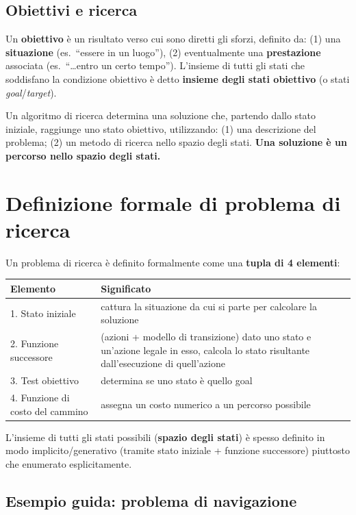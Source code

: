 \documentclass[11pt,a4paper]{report}
\begin{document}
\subsection*{Obiettivi e ricerca}

Un \textbf{obiettivo} è un risultato verso cui sono diretti gli sforzi, definito da: (1) una \textbf{situazione} (es.\ ``essere in un luogo''), (2) eventualmente una \textbf{prestazione} associata (es.\ ``\dots entro un certo tempo''). L'insieme di tutti gli stati che soddisfano la condizione obiettivo è detto \textbf{insieme degli stati obiettivo} (o stati \emph{goal}/\emph{target}).

Un algoritmo di ricerca determina una soluzione che, partendo dallo stato iniziale, raggiunge uno stato obiettivo, utilizzando: (1) una descrizione del problema; (2) un metodo di ricerca nello spazio degli stati. \textbf{Una soluzione è un percorso nello spazio degli stati.}

\section{Definizione formale di problema di ricerca}

Un problema di ricerca è definito formalmente come una \textbf{tupla di 4 elementi}:

\begin{center}
\begin{tabular}{@{}p{3.2cm}p{9.5cm}@{}}
\toprule
\textbf{Elemento} & \textbf{Significato} \\
\midrule
1. Stato iniziale & cattura la situazione da cui si parte per calcolare la soluzione \\
2. Funzione successore & (azioni + modello di transizione) dato uno stato e un'azione legale in esso, calcola lo stato risultante dall'esecuzione di quell'azione \\
3. Test obiettivo & determina se uno stato è quello goal \\
4. Funzione di costo del cammino & assegna un costo numerico a un percorso possibile \\
\bottomrule
\end{tabular}
\end{center}

L'insieme di tutti gli stati possibili (\textbf{spazio degli stati}) è spesso definito in modo implicito/generativo (tramite stato iniziale + funzione successore) piuttosto che enumerato esplicitamente.

\subsection*{Esempio guida: problema di navigazione}
\end{document}
